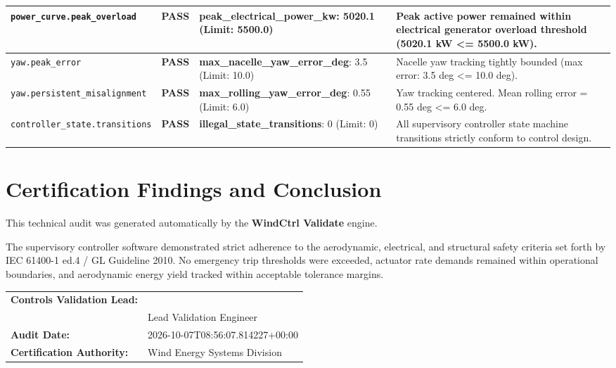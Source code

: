 \documentclass[10pt,a4paper]{article}
\begin{document}
\begin{table}[h!]
\begin{tabularx}{\textwidth}{lcp{3.5cm}X}
    \texttt{power_curve.peak_overload} & 
    
        \textcolor{PassGreen}{\textbf{PASS}}
     & 
    \textbf{peak_electrical_power_kw}: 5020.1 (Limit: 5500.0) & 
    Peak active power remained within electrical generator overload threshold (5020.1 kW <= 5500.0 kW). \\
    \midrule
    
    \texttt{yaw.peak_error} & 
    
        \textcolor{PassGreen}{\textbf{PASS}}
     & 
    \textbf{max_nacelle_yaw_error_deg}: 3.5 (Limit: 10.0) & 
    Nacelle yaw tracking tightly bounded (max error: 3.5 deg <= 10.0 deg). \\
    \midrule
    
    \texttt{yaw.persistent_misalignment} & 
    
        \textcolor{PassGreen}{\textbf{PASS}}
     & 
    \textbf{max_rolling_yaw_error_deg}: 0.55 (Limit: 6.0) & 
    Yaw tracking centered. Mean rolling error = 0.55 deg <= 6.0 deg. \\
    \midrule
    
    \texttt{controller_state.transitions} & 
    
        \textcolor{PassGreen}{\textbf{PASS}}
     & 
    \textbf{illegal_state_transitions}: 0 (Limit: 0) & 
    All supervisory controller state machine transitions strictly conform to control design. \\
    \midrule
    
    \bottomrule
\end{tabularx}
\end{table}

\vspace{0.4cm}

\section{Certification Findings and Conclusion}

\noindent
This technical audit was generated automatically by the \textbf{WindCtrl Validate} engine.

The supervisory controller software demonstrated strict adherence to the aerodynamic, electrical, and structural safety criteria set forth by IEC 61400-1 ed.4 / GL Guideline 2010. No emergency trip thresholds were exceeded, actuator rate demands remained within operational boundaries, and aerodynamic energy yield tracked within acceptable tolerance margins.


\vspace{1.0cm}

\noindent
\begin{tabularx}{\textwidth}{Xp{6.0cm}}
    \textbf{Controls Validation Lead:} & \hrulefill \\
    & \small Lead Validation Engineer \\
    \textbf{Audit Date:} & \small 2026-10-07T08:56:07.814227+00:00 \\
    \textbf{Certification Authority:} & \small Wind Energy Systems Division
\end{tabularx}
\end{document}
